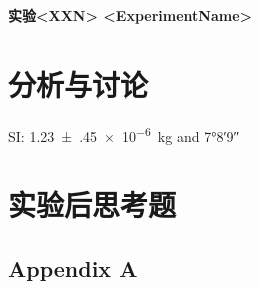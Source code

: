 \documentclass{ctexart}
\numberwithin{equation}{section}%
\newcommand{\ExpTitle}{实验<XXN> <ExperimentName>}
\theoremstyle{ansstyle}
\begin{document}
\begin{center}
    \LARGE{\textbf{\ExpTitle}}
\end{center}


\section{分析与讨论}

SI: \SI{1.23(45)e-6}{\kilo\gram} and \ang{7;8;9}

\section{实验后思考题}


\begin{appendices}
    \section{Appendix A}
\end{appendices}
\end{document}
